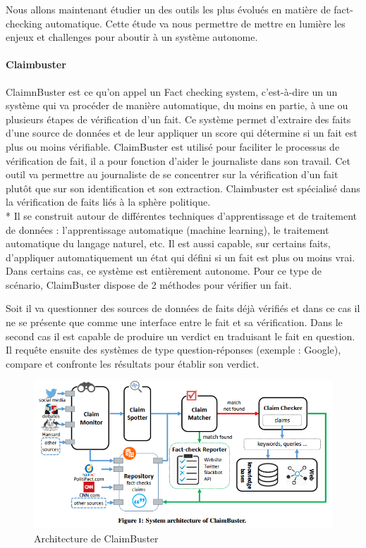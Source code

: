 Nous allons maintenant étudier un des outils les plus évolués en matière de fact-checking automatique. Cette étude va nous permettre de mettre en lumière les enjeux et challenges pour aboutir à un système autonome.

\paragraph{Claimbuster} \cite{hassan2017claimbuster} \cite{hassan2015quest}

ClaimnBuster est ce qu'on appel un Fact checking system, c'est-à-dire un un système qui va procéder de manière automatique, du moins en partie, à une ou plusieurs étapes de vérification d'un fait. Ce système permet d'extraire des faits d'une source de données et de leur appliquer un score qui détermine si un fait est plus ou moins vérifiable. ClaimBuster est utilisé pour faciliter le processus de vérification de fait, il a pour fonction d'aider le journaliste dans son travail. Cet outil va permettre au journaliste de se concentrer sur la vérification d'un fait plutôt que sur son identification et son extraction. Claimbuster est spécialisé dans la vérification de faits liés à la sphère politique.
\\*
Il se construit autour de différentes techniques d'apprentissage et de traitement de données : l'apprentissage automatique (machine learning), le traitement automatique du langage naturel, etc.
Il est aussi capable, sur certains faits, d'appliquer automatiquement un état qui défini si un fait est plus ou moins vrai. Dans certains cas, ce système est entièrement autonome. Pour ce type de scénario, ClaimBuster dispose de 2 méthodes pour vérifier un fait. 

Soit il va questionner des sources de données de faits déjà vérifiés et dans ce cas il ne se présente que comme une interface entre le fait et sa vérification. Dans le second cas il est capable de produire un verdict en traduisant le fait en question. Il requête ensuite des systèmes de type question-réponses (exemple : Google), compare et confronte les résultats pour établir son verdict.

\begin{figure}[ht]
\centering
\includegraphics[width=\textwidth, draft=false]{imgs/claimbuster.PNG}
\caption{Architecture de ClaimBuster}
\label{fig1}
\end{figure}

